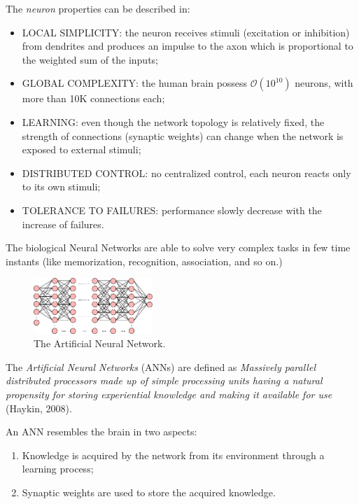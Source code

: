 The \textit{neuron} properties can be described in:
\begin{itemize}
	\item LOCAL SIMPLICITY: the neuron receives stimuli (excitation or inhibition) from dendrites and produces an impulse to the axon which is proportional to the weighted sum of the inputs;
	\item GLOBAL COMPLEXITY: the human brain possess 
	$\mathcal{O}(10^{10})$ 
	neurons, with more than 10K connections each;
	\item LEARNING: even though the network topology is relatively fixed, the strength of connections (synaptic weights) can change when the network is exposed to external stimuli;
	\item DISTRIBUTED CONTROL: no centralized control, each neuron reacts only to its own stimuli;
	\item TOLERANCE TO FAILURES: performance slowly decrease with the increase of failures.
\end{itemize}

The biological Neural Networks are able to solve very complex tasks in few time instants (like memorization, recognition, association, and so on.)

\begin{figure}[t]
	\centering
	\includegraphics[width=0.4\textwidth]{img/ANN}
	\caption{The Artificial Neural Network.}
\end{figure}

The \textit{Artificial Neural Networks} (ANNs) are defined as \textit{Massively parallel distributed processors made up of simple processing units having a natural propensity for storing experiential knowledge and making it available for use} (Haykin, 2008).

An ANN resembles the brain in two aspects:
\begin{enumerate}
	\item Knowledge is acquired by the network from its environment through a learning process;
	\item Synaptic weights are used to store the acquired knowledge.
\end{enumerate}


